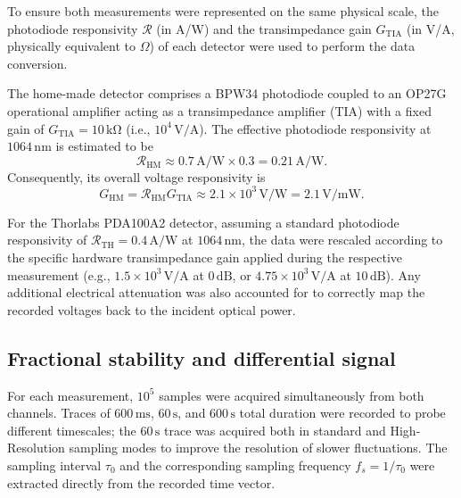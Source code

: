 To ensure both measurements were represented on the same physical scale, the photodiode responsivity $\mathcal{R}$ (in A/W) and the transimpedance gain $G_{\mathrm{TIA}}$ (in V/A, physically equivalent to $\Omega$) of each detector were used to perform the data conversion.

The home-made detector comprises a BPW34 photodiode coupled to an OP27G operational amplifier acting as a transimpedance amplifier (TIA) with a fixed gain of $G_{\mathrm{TIA}} = 10\,\mathrm{k\Omega}$ (i.e., $10^4\,\mathrm{V/A}$). The effective photodiode responsivity at $1064\,\mathrm{nm}$ is estimated to be
\begin{equation}
    \mathcal{R}_{\mathrm{HM}}
    \approx
    0.7\,\mathrm{A/W}\times 0.3
    =
    0.21\,\mathrm{A/W}.
\end{equation}
Consequently, its overall voltage responsivity is
\begin{equation}
    G_{\mathrm{HM}}
    =
    \mathcal{R}_{\mathrm{HM}}G_{\mathrm{TIA}}
    \approx
    2.1\times 10^3\,\mathrm{V/W}
    =
    2.1\,\mathrm{V/mW}.
\end{equation}

For the Thorlabs PDA100A2 detector, assuming a standard photodiode responsivity of $\mathcal{R}_{\mathrm{TH}} = 0.4\,\mathrm{A/W}$ at $1064\,\mathrm{nm}$, the data were rescaled according to the specific hardware transimpedance gain applied during the respective measurement (e.g., $1.5\times 10^3\,\mathrm{V/A}$ at $0\,\mathrm{dB}$, or $4.75\times 10^3\,\mathrm{V/A}$ at $10\,\mathrm{dB}$). Any additional electrical attenuation was also accounted for to correctly map the recorded voltages back to the incident optical power.

\subsection{Fractional stability and differential signal}

For each measurement, $10^5$ samples were acquired simultaneously from both channels. Traces of $600\,\mathrm{ms}$, $60\,\mathrm{s}$, and $600\,\mathrm{s}$ total duration were recorded to probe different timescales; the $60\,\mathrm{s}$ trace was acquired both in standard and High-Resolution sampling modes to improve the resolution of slower fluctuations. The sampling interval $\tau_0$ and the corresponding sampling frequency $f_s = 1/\tau_0$ were extracted directly from the recorded time vector.

